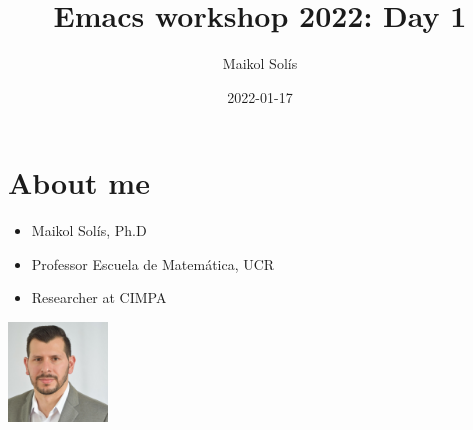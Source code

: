 \documentclass[presentation]{beamer}
\author{Maikol Solís}
\date{2022-01-17}
\title{Emacs workshop 2022: Day 1}
\begin{document}
\begin{frame}[plain]
    \maketitle
\end{frame}

\begin{frame}[plain]
    \tableofcontents
\end{frame}



\section{About me}
\label{sec:org60eb3c6}

\begin{frame}[label={sec:org681765f}]{}
\begin{itemize}
\item Maikol Solís, Ph.D
\item Professor Escuela de Matemática, UCR
\item Researcher at CIMPA
\end{itemize}
\begin{center}
\includegraphics[width=100]{foto.png}
\end{center}
\end{frame}
\end{document}

